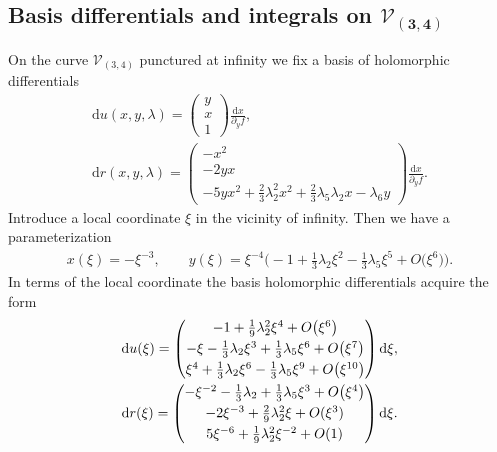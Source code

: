 \documentclass[11pt]{article}
\numberwithin{equation}{section}
\newcommand{\rmd}{\mathrm{d}}
\begin{document}
\subsection[Basis differentials and integrals on $\mathcal{V}_{(3,4)}$]{Basis differentials and integrals on $\boldsymbol{\mathcal{V}_{(3,4)}}$}
On the curve $\mathcal{V}_{(3,4)}$ punctured at infinity we fix a basis of holomorphic differentials
\begin{subequations}\label{Diffs34}
\begin{gather}
\rmd u(x,y,\lambda) = \begin{pmatrix}
 y \\ x \\ 1
 \end{pmatrix} \frac{\rmd x}{\partial_y f},\label{Diff1s34} \\
 \rmd r(x,y,\lambda) = \begin{pmatrix}
 -x^2 \\ -2 y x \\ -5 y x^2 + \frac{2}{3} \lambda_2^2 x^2 + \frac{2}{3} \lambda_5 \lambda_2 x - \lambda_6 y
 \end{pmatrix}\frac{\rmd x}{\partial_y f}. \label{Diff2s34}
\end{gather}
\end{subequations}
Introduce a local coordinate $\xi$ in the vicinity of infinity. Then we have a parameterization
\begin{gather}\label{xyParamC34}
 x(\xi) = -\xi^{-3},\qquad y(\xi) = \xi^{-4}\big({-}1 + \tfrac{1}{3}\lambda_2 \xi^2 - \tfrac{1}{3} \lambda_5 \xi^5 + O\big(\xi^6\big)\big).
\end{gather}
In terms of the local coordinate the basis holomorphic differentials acquire the form
\begin{subequations}
 \begin{gather}\label{C34D1k}
 \rmd u(\xi) =
 \begin{pmatrix}
 -1 + \frac{1}{9} \lambda_2^2 \xi^4 + O\big(\xi^6\big)\vspace{1mm}\\
 -\xi - \frac{1}{3} \lambda_2 \xi^3 + \frac{1}{3} \lambda_5 \xi^6 + O\big(\xi^7\big)\vspace{1mm}\\
 \xi^4 + \frac{1}{3} \lambda_2 \xi^6 - \frac{1}{3} \lambda_5 \xi^{9} + O\big(\xi^{10}\big)
 \end{pmatrix} \rmd \xi,\\
\label{C34D2k}
 \rmd r(\xi) =
 \begin{pmatrix} -\xi^{-2} - \frac{1}{3} \lambda_2 + \frac{1}{3} \lambda_5\xi^3 + O\big(\xi^{4}\big) \vspace{1mm}\\
 - 2 \xi^{-3} + \frac{2}{9}\lambda_2^2 \xi + O(\xi^3)\vspace{1mm}\\
 5 \xi^{-6} + \frac{1}{9} \lambda_2^2 \xi^{-2} + O(1)\end{pmatrix} \rmd \xi.
\end{gather}
\end{subequations}
\end{document}

